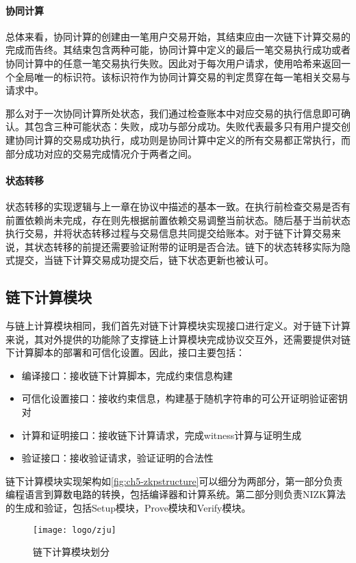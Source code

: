 \paragraph{协同计算} 总体来看，协同计算的创建由一笔用户交易开始，其结束应由一次链下计算交易的完成而告终。其结束包含两种可能，协同计算中定义的最后一笔交易执行成功或者协同计算中的任意一笔交易执行失败。因此对于每次用户请求，使用哈希来返回一个全局唯一的标识符。该标识符作为协同计算交易的判定贯穿在每一笔相关交易与请求中。

那么对于一次协同计算所处状态，我们通过检查账本中对应交易的执行信息即可确认。其包含三种可能状态：失败，成功与部分成功。失败代表最多只有用户提交创建协同计算的交易成功执行，成功则是协同计算中定义的所有交易都正常执行，而部分成功对应的交易完成情况介于两者之间。

\paragraph{状态转移} 状态转移的实现逻辑与上一章在协议中描述的基本一致。在执行前检查交易是否有前置依赖尚未完成，存在则先根据前置依赖交易调整当前状态。随后基于当前状态执行交易，并将状态转移过程与交易信息共同提交给账本。对于链下计算交易来说，其状态转移的前提还需要验证附带的证明是否合法。链下的状态转移实际为隐式提交，当链下计算交易成功提交后，链下状态更新也被认可。

\subsection{链下计算模块}%
与链上计算模块相同，我们首先对链下计算模块实现接口进行定义。对于链下计算来说，其对外提供的功能除了支撑链上计算模块完成协议交互外，还需要提供对链下计算脚本的部署和可信化设置。因此，接口主要包括：
\begin{itemize}
    \setlength{\itemsep}{0pt}
    \setlength{\parsep}{0pt}
    \setlength{\parskip}{0pt}
    \item 编译接口：接收链下计算脚本，完成约束信息构建
    \item 可信化设置接口：接收约束信息，构建基于随机字符串的可公开证明验证密钥对
    \item 计算和证明接口：接收链下计算请求，完成witness计算与证明生成
    \item 验证接口：接收验证请求，验证证明的合法性
\end{itemize}

链下计算模块实现架构如\autoref{fig:ch5-zkpstructure}可以细分为两部分，第一部分负责编程语言到算数电路的转换，包括编译器和计算系统。第二部分则负责NIZK算法的生成和验证，包括Setup模块，Prove模块和Verify模块。
\begin{figure}[htbp]
    \centering
    \texttt{[image: logo/zju]}
    \caption{\label{fig:ch5-zkpstructure}链下计算模块划分}
\end{figure}

